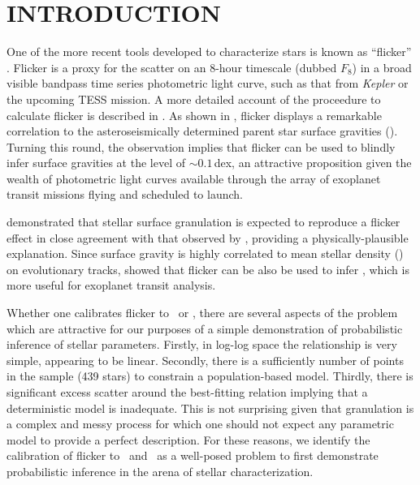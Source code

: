 \documentclass[apjl]{emulateapj}
\begin{document}

\section{INTRODUCTION}
\label{sec:intro}



One of the more recent tools developed to characterize stars is known as
``flicker'' \citep{bastien:2013}. Flicker is a proxy for the scatter on an
8-hour timescale (dubbed $F_8$) in a broad visible bandpass time series
photometric light curve, such as that from \textit{Kepler} or the upcoming TESS
mission. A more detailed account of the proceedure to calculate flicker is
described in \citet{bastien:2013}. As shown in \citet{bastien:2013}, flicker
displays a remarkable correlation to the asteroseismically determined parent
star surface gravities (\logg). Turning this round, the observation implies
that flicker can be used to blindly infer surface gravities at the level of
$\sim0.1$\,dex, an attractive proposition given the wealth of photometric light
curves available through the array of exoplanet transit missions flying and
scheduled to launch.

\citet{cranmer:2014} demonstrated that stellar surface granulation is expected
to reproduce a flicker effect in close agreement with that observed by
\citet{bastien:2013}, providing a physically-plausible explanation. Since
surface gravity is highly correlated to mean stellar density (\rhostar) on
evolutionary tracks, \citet{kipping:2014} showed that flicker can be also
be used to infer \rhostar, which is more useful for exoplanet transit
analysis.

Whether one calibrates flicker to \logg\ or \rhostar, there are several aspects
of the problem which are attractive for our purposes of a simple demonstration
of probabilistic inference of stellar parameters. Firstly, in log-log space the
relationship is very simple, appearing to be linear. Secondly, there is a
sufficiently number of points in the sample (439 stars) to constrain a
population-based model. Thirdly, there is significant excess scatter around the
best-fitting relation implying that a deterministic model is inadequate. This is
not surprising given that granulation is a complex and messy process for which
one should not expect any parametric model to provide a perfect description. For
these reasons, we identify the calibration of flicker to \logg\ and \rhostar\
as a well-posed problem to first demonstrate probabilistic inference in the
arena of stellar characterization.
\end{document}
